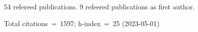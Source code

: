54 refereed publications. 9 refeered publications as first author.

Total citations~=~1597; h-index~=~25 (2023-05-01)